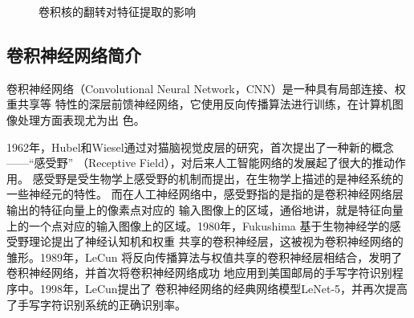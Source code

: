   \begin{figure}
    \centering %
    \caption{卷积核的翻转对特征提取的影响}
    \label{Figure.second.1}
  \end{figure}

  
  \subsection{\hei\xiaosan\textbf{卷积神经网络简介}}
    卷积神经网络（Convolutional Neural Network，CNN）是一种具有局部连接、权重共享等
    特性的深层前馈神经网络，它使用反向传播算法进行训练，在计算机图像处理方面表现尤为出
    色。

    1962年，Hubel和Wiesel通过对猫脑视觉皮层的研究，首次提出了一种新的概念——“感受野”
    （Receptive Field），对后来人工智能网络的发展起了很大的推动作用\cite{hubel1962receptive}。
    感受野是受生物学上感受野的机制而提出，在生物学上描述的是神经系统的一些神经元的特性。
    而在人工神经网络中，感受野指的是指的是卷积神经网络层输出的特征向量上的像素点对应的
    输入图像上的区域，通俗地讲，就是特征向量上的一个点对应的输入图像上的区域。1980年，Fukushima
    \cite{fukushima1982neocognitron}基于生物神经学的感受野理论提出了神经认知机和权重
    共享的卷积神经层，这被视为卷积神经网络的雏形。1989年，LeCun\cite{lecun1989backpropagation}
    将反向传播算法与权值共享的卷积神经层相结合，发明了卷积神经网络，并首次将卷积神经网络成功
    地应用到美国邮局的手写字符识别程序中。1998年，LeCun\cite{lecun1998gradient}提出了
    卷积神经网络的经典网络模型LeNet-5，并再次提高了手写字符识别系统的正确识别率。
    
